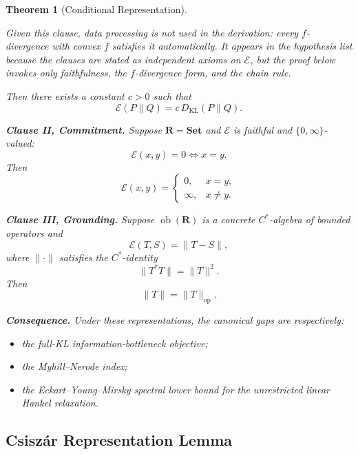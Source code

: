 \documentclass[12pt]{article}
\newtheorem{theorem}{Theorem}[section]
\theoremstyle{definition}
\begin{document}
\begin{theorem}[Conditional Representation]
\begin{enumerate}[label=(\alph*)]
Given this clause, data processing is not used in the derivation: every
$f$-divergence with convex $f$ satisfies it automatically.  It appears in
the hypothesis list because the clauses are stated as independent axioms on
$\mathcal E$, but the proof below invokes only faithfulness, the
$f$-divergence form, and the chain rule.
\end{enumerate}
Then there exists a constant $c>0$ such that
\[
\mathcal E(P\|Q)
=
c\,D_{\mathrm{KL}}(P\|Q).
\]

\medskip
\noindent\textbf{Clause II, Commitment.}
Suppose $\mathbf R=\mathbf{Set}$ and $\mathcal E$ is faithful and
$\{0,\infty\}$-valued:
\[
\mathcal E(x,y)=0
\iff
x=y.
\]
Then
\[
\mathcal E(x,y)=
\begin{cases}
0,&x=y,\\
\infty,&x\neq y.
\end{cases}
\]

\medskip
\noindent\textbf{Clause III, Grounding.}
Suppose $\operatorname{ob}(\mathbf R)$ is a concrete $C^*$-algebra of bounded
operators and
\[
\mathcal E(T,S)=\|T-S\|,
\]
where $\|\cdot\|$ satisfies the $C^*$-identity
\[
\|T^*T\|=\|T\|^2.
\]
Then
\[
\|T\|=\|T\|_{\mathrm{op}}.
\]

\medskip
\noindent\textbf{Consequence.}
Under these representations, the canonical gaps are respectively:
\begin{itemize}
\item the full-KL information-bottleneck objective;
\item the Myhill--Nerode index;
\item the Eckart--Young--Mirsky spectral lower bound for the unrestricted
linear Hankel relaxation.
\end{itemize}
\end{theorem}

\subsection{Csisz\'ar Representation Lemma}
\label{subsec:csiszar-lemma}
\end{document}
